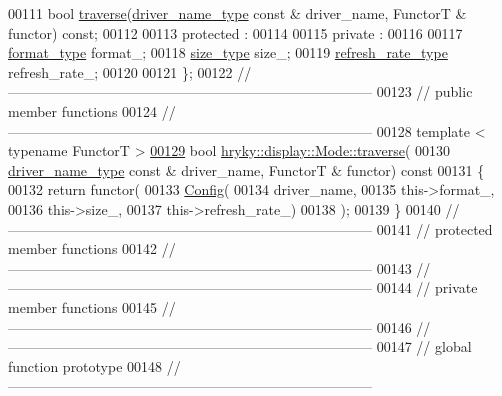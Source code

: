 \begin{DoxyCode}
00111     \textcolor{keywordtype}{bool} \hyperlink{classhryky_1_1display_1_1_mode_a3b1659edc90d32f841bcd30be0d925f2}{traverse}(\hyperlink{classhryky_1_1_string}{driver_name_type} \textcolor{keyword}{const} & driver\_name, FunctorT & functor) \textcolor{keyword}{
      const};
00112 
00113 \textcolor{keyword}{protected} :
00114 
00115 \textcolor{keyword}{private} :
00116 
00117     \hyperlink{classhryky_1_1pixel_1_1_format}{format_type}         format\_;
00118     \hyperlink{classhryky_1_1geometry_1_1coord_1_1_cartesian2_d}{size_type}           size\_;
00119     \hyperlink{namespacehryky_1_1display_ac8bdbe1db3aaf491d26848562e9fa29c}{refresh_rate_type}   refresh\_rate\_;
00120 
00121 \};
00122 \textcolor{comment}{//
      ------------------------------------------------------------------------------}
00123 \textcolor{comment}{// public member functions}
00124 \textcolor{comment}{//
      ------------------------------------------------------------------------------}
00128 \textcolor{comment}{}\textcolor{keyword}{template} < \textcolor{keyword}{typename} FunctorT >
\hypertarget{display__mode_8h_source_l00129}{}\hyperlink{classhryky_1_1display_1_1_mode_a3b1659edc90d32f841bcd30be0d925f2}{00129} \textcolor{keywordtype}{bool} \hyperlink{classhryky_1_1display_1_1_mode_a3b1659edc90d32f841bcd30be0d925f2}{hryky::display::Mode::traverse}(
00130     \hyperlink{classhryky_1_1_string}{driver_name_type} \textcolor{keyword}{const} & driver\_name, FunctorT & functor)\textcolor{keyword}{ const}
00131 \textcolor{keyword}{}\{
00132     \textcolor{keywordflow}{return} functor(
00133         \hyperlink{classhryky_1_1display_1_1_config}{Config}(
00134             driver\_name,
00135             this->format\_,
00136             this->size\_,
00137             this->refresh\_rate\_)
00138         );
00139 \}
00140 \textcolor{comment}{//
      ------------------------------------------------------------------------------}
00141 \textcolor{comment}{// protected member functions}
00142 \textcolor{comment}{//
      ------------------------------------------------------------------------------}
00143 \textcolor{comment}{//
      ------------------------------------------------------------------------------}
00144 \textcolor{comment}{// private member functions}
00145 \textcolor{comment}{//
      ------------------------------------------------------------------------------}
00146 \textcolor{comment}{//
      ------------------------------------------------------------------------------}
00147 \textcolor{comment}{// global function prototype}
00148 \textcolor{comment}{//
      ------------------------------------------------------------------------------}

\end{DoxyCode}

